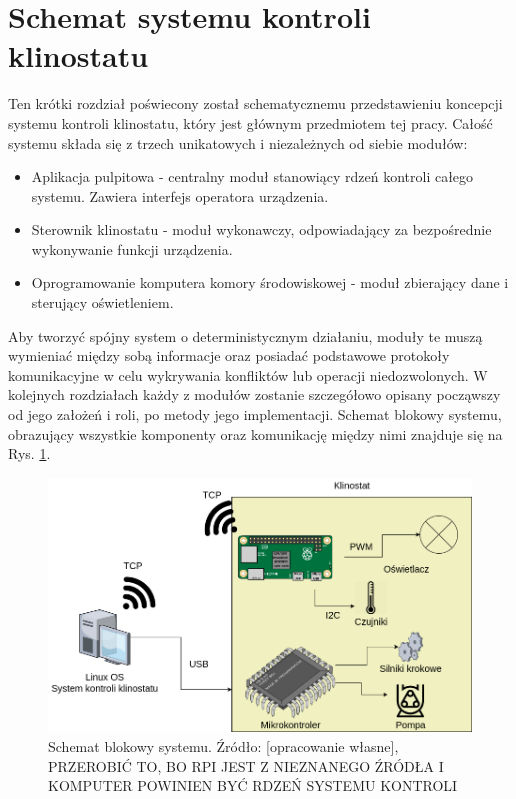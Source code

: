 \graphicspath{{./System/images}}

\chapter*{Schemat systemu kontroli klinostatu}

Ten krótki rozdział poświecony został schematycznemu przedstawieniu koncepcji systemu kontroli klinostatu, który jest głównym przedmiotem tej pracy. Całość systemu składa się z trzech unikatowych i niezależnych od siebie modułów:
\begin{itemize}

	\item Aplikacja pulpitowa - centralny moduł stanowiący rdzeń kontroli całego systemu. Zawiera interfejs operatora urządzenia.
	\item Sterownik klinostatu - moduł wykonawczy, odpowiadający za bezpośrednie wykonywanie funkcji urządzenia.
	\item Oprogramowanie komputera komory środowiskowej - moduł zbierający dane i sterujący oświetleniem.

\end{itemize}

Aby tworzyć spójny system o deterministycznym działaniu, moduły te muszą wymieniać między sobą informacje oraz posiadać podstawowe protokoły komunikacyjne w celu wykrywania konfliktów lub operacji niedozwolonych. W kolejnych rozdziałach każdy z modułów zostanie szczegółowo opisany począwszy od  jego założeń i roli, po metody jego implementacji. Schemat blokowy systemu, obrazujący wszystkie komponenty oraz komunikację między nimi znajduje się na Rys. \ref{fig:schemat_blokowy}.

\begin{figure}[ht]
	
	\centering
	\includegraphics[scale=.4]{schemat_blokowy}
	\caption{Schemat blokowy systemu. Źródło: [opracowanie własne], PRZEROBIĆ TO, BO RPI JEST Z NIEZNANEGO ŹRÓDŁA I KOMPUTER POWINIEN BYĆ RDZEŃ SYSTEMU KONTROLI}
	\label{fig:schemat_blokowy}
	
\end{figure}